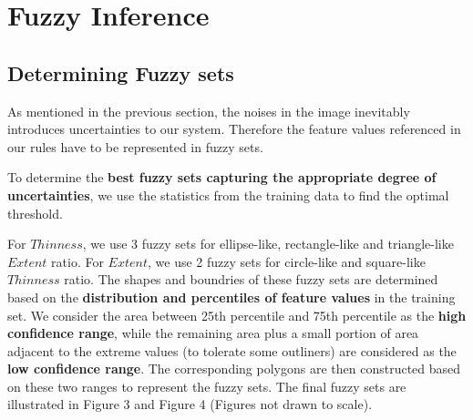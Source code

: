 \section{Fuzzy Inference}

\subsection{Determining Fuzzy sets}

As mentioned in the previous section, the noises in the image inevitably introduces uncertainties to our system. Therefore the feature values referenced in our rules have to be represented in fuzzy sets.

To determine the \textbf{best fuzzy sets capturing the appropriate degree of uncertainties}, we use the statistics from the training data to find the optimal threshold.

For $Thinness$, we use 3 fuzzy sets for ellipse-like, rectangle-like and triangle-like $Extent$ ratio. For $Extent$, we use 2 fuzzy sets for circle-like and square-like $Thinness$ ratio. The shapes and boundries of these fuzzy sets are determined based on the \textbf{distribution and percentiles of feature values} in the training set. We consider the area between 25th percentile and 75th percentile as the \textbf{high confidence range}, while the remaining area plus a small portion of area adjacent to the extreme values (to tolerate some outliners) are considered as the \textbf{low confidence range}. The corresponding polygons are then constructed based on these two ranges to represent the fuzzy sets. The final fuzzy sets are illustrated in Figure 3 and Figure 4 (Figures not drawn to scale).


